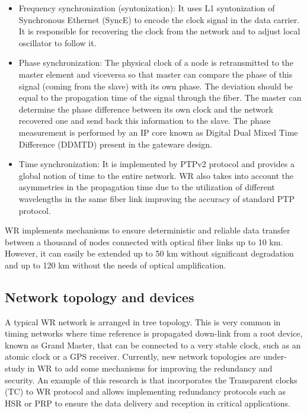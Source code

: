 \begin{itemize}
	\item {Frequency synchronization (syntonization): It uses L1 syntonization 
	of Synchronous Ethernet (SyncE) to encode the clock signal in the data 
	carrier. It is responsible for recovering the clock from the network and to 
	adjust local oscillator to follow it.}
	\item {Phase synchronization: The physical clock of a node is retransmitted to the master element and viceversa so that master can compare the phase of this signal (coming from the slave) with its own phase. The deviation should be equal to the propagation time of the signal through the fiber. The master can determine the phase difference between its own clock and the network recovered one and send back this information to the slave. The phase measurement is performed by an IP core known as Digital Dual Mixed Time Difference (DDMTD) present in the gateware design.}
	\item {Time synchronization: It is implemented by PTPv2 protocol and provides a global notion of time to the entire network. WR also takes into account the asymmetries in the propagation time due to the utilization of different wavelengths in the same fiber link improving the accuracy of standard PTP protocol.}
\end{itemize}


WR implements mechanisms to ensure deterministic and reliable data transfer 
between a thousand of nodes connected with  optical fiber links up to 10 km. 
However, it can easily be extended up to 50 km without significant degradation 
and up to 120 km without the needs of optical amplification. 

\subsection{Network topology and devices} \label{subsec:wr-net-devices}
A typical WR 
network is arranged in tree topology. This is very common in timing networks 
where time reference is propagated down-link from a root device, known as Grand 
Master, that can be connected to a very stable clock, such as an atomic clock 
or a GPS receiver. Currently, new network topologies are under-study in WR to 
add some mechanisms for improving the redundancy and security. An example of 
this research is \cite{jlgutierrez-paper-redundancy} that incorporates the 
Transparent clocks (TC) to WR protocol and allows implementing redundancy 
protocols such as HSR or PRP to ensure the data delivery and reception in 
critical applications.

